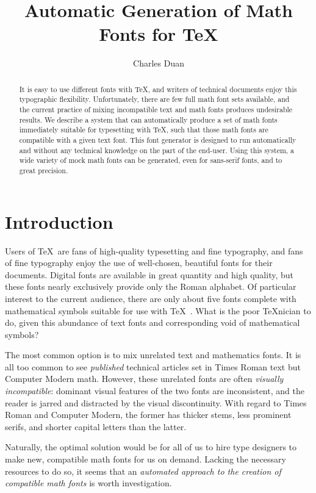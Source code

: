 \documentclass[preprint]{ltugproc}
\title{Automatic Generation of Math Fonts for \TeX}
\author{Charles Duan}
\begin{document}
\begin{abstract}
It is easy to use different fonts with \TeX, and writers of technical documents
enjoy this typographic flexibility. Unfortunately, there are few full math font
sets available, and the current practice of mixing incompatible text and math
fonts produces undesirable results. We describe a system that can automatically
produce a set of math fonts immediately suitable for typesetting with \TeX, such
that those math fonts are compatible with a given text font. This font generator
is designed to run automatically and without any technical knowledge on the part
of the end-user. Using this system, a wide variety of mock math fonts can be
generated, even for sans-serif fonts, and to great precision.
\end{abstract}

\maketitle

\section{Introduction}

Users of \TeX\ are fans of high-quality typesetting and fine typography, and
fans of fine typography enjoy the use of well-chosen, beautiful fonts for their
documents. Digital fonts are available in great quantity and high quality, but
these fonts nearly exclusively provide only the Roman alphabet. Of particular
interest to the current audience, there are only about five fonts complete with
mathematical symbols suitable for use with \TeX~\cite{bouche}. What is the poor
\TeX\-nician to do, given this abundance of text fonts and corresponding void of
mathematical symbols?

The most common option is to mix unrelated text and mathematics fonts. It is all
too common to see \emph{published} technical articles set in Times Roman text
but Computer Modern math. However, these unrelated fonts are often
\emph{visually incompatible}: dominant visual features of the two fonts are
inconsistent, and the reader is jarred and distracted by the visual
discontinuity. With regard to Times Roman and Computer Modern, the former has
thicker stems, less prominent serifs, and shorter capital letters than the
latter.

Naturally, the optimal solution would be for all of us to hire type designers to
make new, compatible math fonts for us on demand. Lacking the necessary
resources to do so, it seems that an \emph{automated approach to the creation of
compatible math fonts} is worth investigation.
\end{document}
